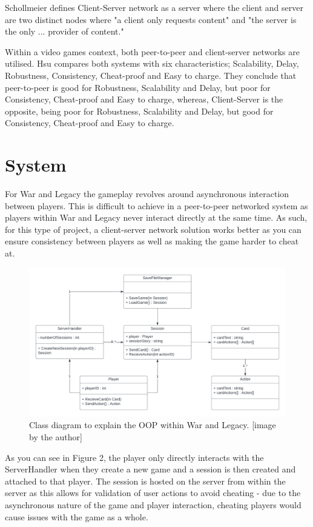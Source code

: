 \documentclass{article}
\begin{document}
Schollmeier defines Client-Server network as a server where the client and server are two distinct nodes where "a client only requests content" and "the server is the only ... provider of content."

Within a video games context, both peer-to-peer and client-server networks are utilised. Hsu compares both systems\cite{hsu2003} with six characteristics; Scalability, Delay, Robustness, Consistency, Cheat-proof and Easy to charge. They conclude that peer-to-peer is good for Robustness, Scalability and Delay, but poor for Consistency, Cheat-proof and Easy to charge, whereas, Client-Server is the opposite, being poor for Robustness, Scalability and Delay, but good for Consistency, Cheat-proof and Easy to charge.

\section{System}
For War and Legacy the gameplay revolves around asynchronous interaction between players. This is difficult to achieve in a peer-to-peer networked system as players within War and Legacy never interact directly at the same time. As such, for this type of project, a client-server network solution works better as you can ensure consistency between players as well as making the game harder to cheat at.

\begin{figure}[!h]
    \centering
    \includegraphics[width=12cm]{class-diagram.png}
    \caption{Class diagram to explain the OOP within War and Legacy. [image by the author]}
\end{figure}

As you can see in Figure 2, the player only directly interacts with the ServerHandler when they create a new game and a session is then created and attached to that player. The session is hosted on the server from within the server as this allows for validation of user actions to avoid cheating - due to the asynchronous nature of the game and player interaction, cheating players would cause issues with the game as a whole.
\end{document}
